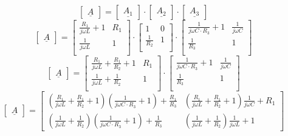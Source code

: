 \documentclass[a4paper]{article}
\begin{document}
\begin{equation*}
	\begin{bmatrix}
		\underline{A}
	\end{bmatrix}=
	\begin{bmatrix}
		\underline{A_1}
	\end{bmatrix}\cdot
	\begin{bmatrix}
		\underline{A_2}
	\end{bmatrix}\cdot
	\begin{bmatrix}
		\underline{A_3}
	\end{bmatrix}
\end{equation*}
\begin{equation*}
	\begin{bmatrix}
		\underline{A}
	\end{bmatrix}=
	\begin{bmatrix}
		\frac{R_1}{j\omega L} + 1 & R_1\\
		\frac{1}{j\omega L} & 1\\
	\end{bmatrix}\cdot
	\begin{bmatrix}
		1 & 0\\
		\frac{1}{R_2} & 1\\
	\end{bmatrix}\cdot
	\begin{bmatrix}
		\frac{1}{j\omega C \cdot R_3} + 1 & \frac{1}{j\omega C}\\
		\frac{1}{R_3} & 1\\
	\end{bmatrix}
\end{equation*}
\begin{equation*}
	\begin{bmatrix}
		\underline{A}
	\end{bmatrix}=
	\begin{bmatrix}
		\frac{R_1}{j\omega L} + \frac{R_1}{R_2} + 1 & R_1\\
		\frac{1}{j\omega L} + \frac{1}{R_2} & 1\\
	\end{bmatrix}\cdot
	\begin{bmatrix}
		\frac{1}{j\omega C \cdot R_3} + 1 & \frac{1}{j\omega C}\\
		\frac{1}{R_3} & 1\\
	\end{bmatrix}
\end{equation*}
\begin{equation*}
	\begin{bmatrix}
		\underline{A}
	\end{bmatrix}=
	\begin{bmatrix}
		\left(\frac{R_1}{j\omega L} + \frac{R_1}{R_2} + 1\right)\left(\frac{1}{j\omega C \cdot R_3} + 1\right) + \frac{R_1}{R_3} &
		\left(\frac{R_1}{j\omega L} + \frac{R_1}{R_2} + 1\right)\frac{1}{j\omega C} + R_1\\
		\left(\frac{1}{j\omega L} + \frac{1}{R_2}\right)\left(\frac{1}{j\omega C \cdot R_3} + 1\right) + \frac{1}{R_3} &
		\left(\frac{1}{j\omega L} + \frac{1}{R_2}\right)\frac{1}{j\omega L} + 1
	\end{bmatrix}
\end{equation*}
\end{document}
